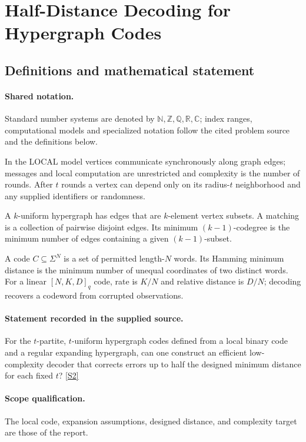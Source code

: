 \documentclass[11pt]{article}
\newcommand{\sref}[2]{\hyperlink{source:#1:#2}{[S#2]}}
\begin{document}
\section{Half-Distance Decoding for Hypergraph Codes}\label{statement}

\subsection{Definitions and mathematical statement}

\paragraph{Shared notation.}Standard number systems are denoted by $\mathbb N,\mathbb Z,\mathbb Q,\mathbb R,\mathbb C$; index ranges, computational models and specialized notation follow the cited problem source and the definitions below.


In the LOCAL model vertices communicate synchronously along graph edges; messages and local computation are unrestricted and complexity is the number of rounds. After $t$ rounds a vertex can depend only on its radius-$t$ neighborhood and any supplied identifiers or randomness.

A $k$-uniform hypergraph has edges that are $k$-element vertex subsets. A matching is a collection of pairwise disjoint edges. Its minimum $(k-1)$-codegree is the minimum number of edges containing a given $(k-1)$-subset.

A code $C\subseteq\Sigma^N$ is a set of permitted length-$N$ words. Its Hamming minimum distance is the minimum number of unequal coordinates of two distinct words. For a linear $[N,K,D]_q$ code, rate is $K/N$ and relative distance is $D/N$; decoding recovers a codeword from corrupted observations.
\paragraph{Statement recorded in the supplied source.}
For the $t$-partite, $t$-uniform hypergraph codes defined from a local binary code and a regular expanding hypergraph, can one construct an efficient low-complexity decoder that corrects errors up to half the designed minimum distance for each fixed $t$? \sref{statement}{2}
\paragraph{Scope qualification.}
The local code, expansion assumptions, designed distance, and complexity target are those of the report.
\end{document}
